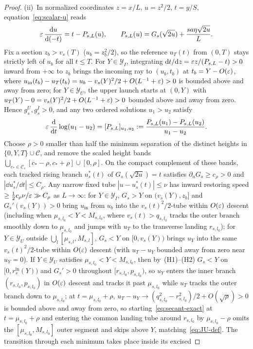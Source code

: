 \begin{proof}
(ii)~In normalized coordinates $z=x/L$, $u=z^2/2$, $t=y/S$, equation~\eqref{eq:scalar-u} reads
\[
  \varepsilon\,\frac{\mathrm{d} u}{\mathrm{d}(-t)} = t - P_{s,L}(u),\qquad P_{s,L}(u)=G_s(\sqrt{2u}) + \frac{sa\eta\sqrt{2u}}{L}.
\]
Fix a section $z_b>v_s(T)$ ($u_b=z_b^2/2$), so the reference $u_T(t)$ from $(0,T)$ stays strictly left of $u_b$ for all $t\le T$. For $Y\in\mathcal{Y}_I$, integrating $\mathrm{d} t/\mathrm{d} z=\varepsilon z/(P_{s,L}-t)>0$ inward from $+\infty$ to $z_b$ brings the incoming ray to $(u_b,t_b)$ at $t_b=Y-O(\varepsilon)$, where $u_{\mathrm{in}}(t_b)-u_T(t_b)=u_b-v_s(Y)^2/2+O(L^{-1}+\varepsilon)>0$ is bounded above and away from zero; for $Y\in\mathcal{Y}_U$, the upper launch starts at $(0,Y)$ with $u_T(Y)-0=v_s(Y)^2/2+O(L^{-1}+\varepsilon)>0$ bounded above and away from zero. Hence $g_s^U,g_s^I>0$, and any two ordered solutions $u_1>u_2$ satisfy
\begin{equation}\label{eq:secant-exact}
  \varepsilon\,\frac{\mathrm{d}}{\mathrm{d} t}\log(u_1-u_2) = [P_{s,L}]_{u_1,u_2} := \frac{P_{s,L}(u_1)-P_{s,L}(u_2)}{u_1-u_2}.
\end{equation}
Choose $\rho>0$ smaller than half the minimum separation of the distinct
heights in $\{0,Y,T\}\cup\mathcal C$, and remove the scaled height bands $\bigcup_{c_*\in\mathcal{C}_s}[c_*-\rho,c_*+\rho]\cup[0,\rho]$.
On the compact complement of these bands, each tracked rising branch $u_s^*(t)$ of $G_s(\sqrt{2u})=t$ satisfies $\partial_u G_s\ge c_\rho>0$ and $|\dd u_s^*/\dd t|\le C_\rho$. Any narrow fixed tube $|u-u_s^*(t)|\le\nu$ has inward restoring speed $\ge\tfrac12 c_\rho\nu/\varepsilon\gg C_\rho$ as $L\to\infty$: for $Y\in\mathcal{Y}_I$, $G_s>Y$ on $(v_s(Y),z_b]$ and $G_s'(v_s(Y))>0$ bring $u_{\mathrm{in}}$ from $u_b$ into the $v_s(t)^2/2$-tube within $O(\varepsilon)$ descent (including when $\mu_{s,l_0}<Y<M_{s,l_0}$, where $v_s(t)>q_{s,l_0}$ tracks the outer branch smoothly down to $\mu_{s,l_0}$ and jumps with $u_T$ to the transverse landing $r_{s,l_0}$); for $Y\in\mathcal{Y}_U$ outside $\bigcup_l[\mu_{s,l},M_{s,l}]$, $G_s<Y$ on $[0,v_s(Y))$ brings $u_Y$ into the same $v_s(t)^2/2$-tube within $O(\varepsilon)$ descent (with $u_T-u_Y$ bounded away from zero near $u_Y=0$). If $Y\in\mathcal{Y}_U$ satisfies $\mu_{s,l_0}<Y<M_{s,l_0}$, then by~(H1)--(H2) $G_s<Y$ on $[0,r_s^{\mathrm{in}}(Y))$ and $G_s'>0$ throughout $[r_{s,l_0},p_{s,l_0})$, so $u_Y$ enters the inner branch $(r_{s,l_0},p_{s,l_0})$ in $O(\varepsilon)$ descent and tracks it past $\mu_{s,l_0}$ while $u_T$ tracks the outer branch down to $\mu_{s,l_0}$; at $t=\mu_{s,l_0}+\rho$, $u_T-u_Y\to(q_{s,l_0}^2-r_{s,l_0}^2)/2+O(\sqrt\rho)>0$ is bounded above and away from zero, so starting~\eqref{eq:secant-exact} at $t=\mu_{s,l_0}+\rho$ and entering the common landing tube around $r_{s,l_0}$ by $\mu_{s,l_0}-\rho$ omits the $[\mu_{s,l_0},M_{s,l_0}]$ outer segment and skips above $Y$, matching~\eqref{eq:JU-def}. The transition through each minimum takes place inside its excised

\end{proof}
